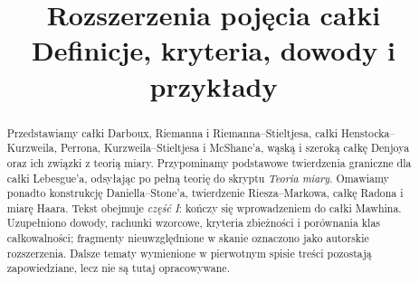 \documentclass[11pt,a4paper]{article}
\title{Rozszerzenia pojęcia całki\\\large Definicje, kryteria, dowody i przykłady}
\author{}
\date{}
\numberwithin{equation}{section}
\theoremstyle{plain}
\theoremstyle{definition}
\theoremstyle{remark}
\begin{document}
\maketitle
\begin{abstract}
Przedstawiamy całki Darboux, Riemanna i Riemanna--Stieltjesa, całki Henstocka--Kurzweila, Perrona, Kurzweila--Stieltjesa i McShane'a, wąską i szeroką całkę Denjoya oraz ich związki z teorią miary. Przypominamy podstawowe twierdzenia graniczne dla całki Lebesgue'a, odsyłając po pełną teorię do skryptu \emph{Teoria miary}. Omawiamy ponadto konstrukcję Daniella--Stone'a, twierdzenie Riesza--Markowa, całkę Radona i miarę Haara. Tekst obejmuje \emph{część I}: kończy się wprowadzeniem do całki Mawhina. Uzupełniono dowody, rachunki wzorcowe, kryteria zbieżności i porównania klas całkowalności; fragmenty nieuwzględnione w skanie oznaczono jako autorskie rozszerzenia. Dalsze tematy wymienione w pierwotnym spisie treści pozostają zapowiedziane, lecz nie są tutaj opracowywane.
\end{abstract}
\tableofcontents


















\end{document}
